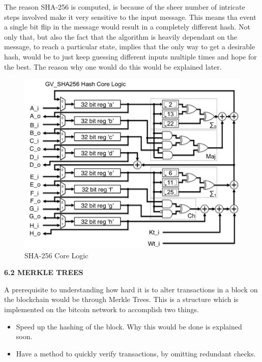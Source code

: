 \documentclass[12pt,a4paper]{report}
\begin{document}
\begin{justify}
\vspace{10mm}
\newpage
The reason SHA-256 is computed, is because of the sheer number of intricate steps involved make it very sensitive to the input message. This means tha event a single bit flip in the message would result in a completely different hash. \newline
Not only that, but also the fact that the algorithm is heavily dependant on the message, to reach a particular state, implies that the only way to get a desirable hash, would be to just keep guessing different inputs multiple times and hope for the best. The reason why one would do this would be explained later.


\vspace{10mm}
\begin{figure}[h]
\centering
\caption{SHA-256 Core Logic \cite{SHA}}
\includegraphics[scale=0.50]{pics/usercontent,img,1471445681.png}
\end{figure}
\vspace{10mm}

\textbf{6.2 MERKLE TREES}
\vspace{10mm}

A prerequisite to understanding how hard it is to alter transactions in a block on the blockchain would be through Merkle Trees. This is a structure which is implemented on the bitcoin network to accomplish two things.
\begin{itemize}
    \item Speed up the hashing of the block. Why this would be done is explained soon.
    \item Have a method to quickly verify transactions, by omitting redundant checks.
\end{itemize}
\newpage
\vspace{10mm}


\end{justify}
\end{document}
